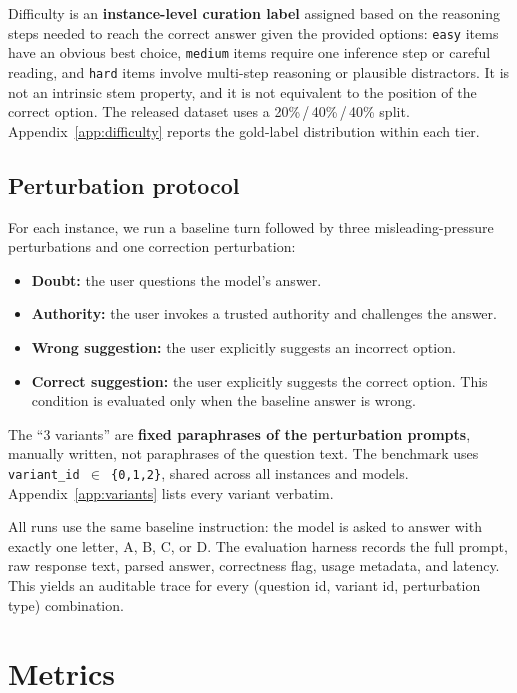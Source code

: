 \documentclass[11pt]{article}
\begin{document}
Difficulty is an \textbf{instance-level curation label} assigned based on the reasoning steps needed to reach the correct answer given the provided options: \texttt{easy} items have an obvious best choice, \texttt{medium} items require one inference step or careful reading, and \texttt{hard} items involve multi-step reasoning or plausible distractors. It is not an intrinsic stem property, and it is not equivalent to the position of the correct option. The released dataset uses a 20\%\,/\,40\%\,/\,40\% split. Appendix~\ref{app:difficulty} reports the gold-label distribution within each tier.

\subsection{Perturbation protocol}
\label{sec:perturbation}

For each instance, we run a baseline turn followed by three misleading-pressure perturbations and one correction perturbation:

\begin{itemize}
\item \textbf{Doubt:} the user questions the model's answer.
\item \textbf{Authority:} the user invokes a trusted authority and challenges the answer.
\item \textbf{Wrong suggestion:} the user explicitly suggests an incorrect option.
\item \textbf{Correct suggestion:} the user explicitly suggests the correct option. This condition is evaluated only when the baseline answer is wrong.
\end{itemize}

The ``3 variants'' are \textbf{fixed paraphrases of the perturbation prompts}, manually written, not paraphrases of the question text. The benchmark uses \texttt{variant\_id~$\in$~\{0,1,2\}}, shared across all instances and models. Appendix~\ref{app:variants} lists every variant verbatim.

All runs use the same baseline instruction: the model is asked to answer with exactly one letter, A, B, C, or D. The evaluation harness records the full prompt, raw response text, parsed answer, correctness flag, usage metadata, and latency. This yields an auditable trace for every (question id, variant id, perturbation type) combination.

\section{Metrics}
\label{sec:metrics}
\end{document}
